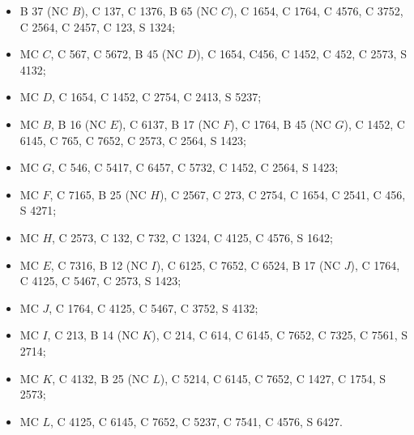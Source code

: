 \documentclass[12pt]{article}
\numberwithin{equation}{section}
\begin{document}
\begin{itemize}

\item B 37 (NC $B$), C 137, C 1376, B 65 (NC $C$), C 1654, C 1764, C 4576, C 3752, C 2564, C 2457, C 123, S 1324;

\item MC $C$, C 567, C 5672, B 45 (NC $D$), C 1654, C456, C 1452, C 452, C 2573, S 4132;

\item MC $D$, C 1654, C 1452, C 2754, C 2413, S 5237;

\item MC $B$, B 16 (NC $E$), C 6137, B 17 (NC $F$), C 1764, B 45 (NC $G$), C 1452, C 6145, C 765, C 7652, C 2573, C 2564, S 1423;

\item MC $G$, C 546, C 5417, C 6457, C 5732, C 1452, C 2564, S 1423;

\item MC $F$, C 7165, B 25 (NC $H$), C 2567, C 273, C 2754, C 1654, C 2541, C 456, S 4271;

\item MC $H$, C 2573, C 132, C 732, C 1324, C 4125, C 4576, S 1642;

\item MC $E$, C 7316, B 12 (NC $I$), C 6125, C 7652, C 6524, B 17 (NC $J$), C 1764, C 4125, C 5467, C 2573, S 1423;

\item MC $J$, C 1764, C 4125, C 5467, C 3752, S 4132;

\item MC $I$, C 213, B 14 (NC $K$), C 214, C 614, C 6145, C 7652, C 7325, C 7561, S 2714;

\item MC $K$, C 4132, B 25 (NC $L$), C 5214, C 6145, C 7652, C 1427, C 1754, S 2573;

\item MC $L$, C 4125, C 6145, C 7652, C 5237, C 7541, C 4576, S 6427.

\end{itemize}
\end{document}
